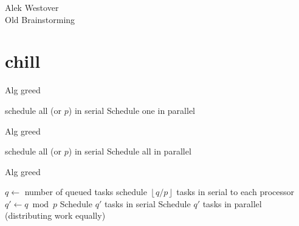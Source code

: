 \documentclass{article}[11pt]
\newcommand{\floor}[1]{\left\lfloor #1 \right\rfloor}
\begin{document}
\begin{center}
\begin{Large}
	Alek Westover \\
	\vspace{2mm}
	Old Brainstorming 
\end{Large}
\end{center}
\thispagestyle{empty}

\section{chill}


\begin{algorithm}
  \caption{Alg greed}
  \begin{algorithmic}[1]
          \State schedule all (or $p$) in serial
        \Else
          \State Schedule one in parallel
        \EndIf
      \EndIf
    \EndWhile
    \EndProcedure
  \end{algorithmic}
\end{algorithm}


\begin{algorithm}
  \caption{Alg greed}
  \begin{algorithmic}[1]
          \State schedule all (or $p$) in serial
        \Else
          \State Schedule all in parallel
        \EndIf
      \EndIf
    \EndWhile
    \EndProcedure
  \end{algorithmic}
\end{algorithm}

\begin{algorithm}
  \caption{Alg greed}
  \begin{algorithmic}[1]
        \State $q \gets $ number of queued tasks
        \State schedule $\floor{q/p}$ tasks in serial to each processor
        \State $q' \gets q\bmod p$
          \State Schedule $q'$ tasks in serial
        \Else
        \State Schedule $q'$ tasks in parallel (distributing work equally)
        \EndIf
      \EndIf
    \EndWhile
    \EndProcedure
  \end{algorithmic}
\end{algorithm}
\end{document}
